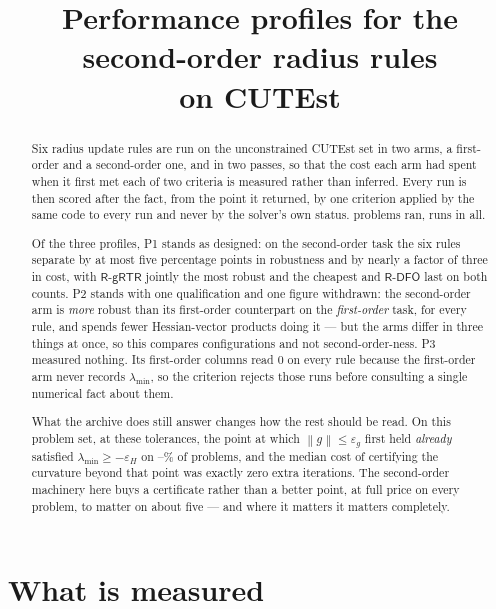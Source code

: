 \documentclass[11pt,a4paper]{article}
\title{Performance profiles for the second-order radius rules\\ on CUTEst}
\author{}
\date{}
\providecommand{\norm}[1]{\left \lVert #1 \right \rVert}
\providecommand{\Rdfo}{\textsf{R-DFO}}
\providecommand{\Rgrtr}{\textsf{R-gRTR}}
\theoremstyle{remark}
\begin{document}
\maketitle

\begin{abstract}
Six radius update rules are run on the unconstrained CUTEst set in two arms, a
first-order and a second-order one, and in two passes, so that the cost each arm
had spent when it first met each of two criteria is measured rather than inferred.
Every run is then scored after the fact, from the point it returned, by one
criterion applied by the same code to every run and never by the solver's own
status. \NOpened{} problems ran, \NRuns{} runs in all.

Of the three profiles, P1 stands as designed: on the second-order task the six
rules separate by at most five percentage points in robustness and by nearly a
factor of three in cost, with $\Rgrtr$ jointly the most robust and the cheapest
and $\Rdfo$ last on both counts. P2 stands with one qualification and one figure
withdrawn: the second-order arm is \emph{more} robust than its first-order
counterpart on the \emph{first-order} task, for every rule, and spends fewer
Hessian-vector products doing it --- but the arms differ in three things at once,
so this compares configurations and not second-order-ness. P3 measured nothing.
Its first-order columns read $0$ on every rule because the first-order arm never
records $\lambda_{\min}$, so the criterion rejects those runs before consulting a
single numerical fact about them.

What the archive does still answer changes how the rest should be read. On this
problem set, at these tolerances, the point at which $\norm{g} \leq \varepsilon_g$
first held \emph{already} satisfied $\lambda_{\min} \geq -\varepsilon_H$ on
\CurvAlreadyMin--\CurvAlreadyMax\% of problems, and the median cost of certifying
the curvature beyond that point was exactly zero extra iterations. The
second-order machinery here buys a certificate rather than a better point, at
full price on every problem, to matter on about five --- and where it matters it
matters completely.
\end{abstract}

\section{What is measured}\label{sec: measured}
\end{document}
